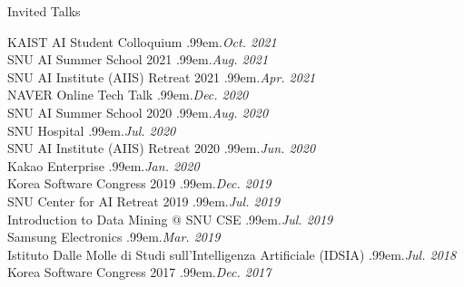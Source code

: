 \documentclass{resume} %
\makeatletter
\newcommand \Dotfill {\leavevmode \cleaders \hb@xt@ .99em{\hss .\hss }\hfill \kern \z@}
\makeatother
\begin{document}
\begin{rSection}{Invited Talks}

KAIST AI Student Colloquium \smallskip \Dotfill \emph{Oct. 2021} \\ 
SNU AI Summer School 2021 \smallskip \Dotfill \emph{Aug. 2021} \\ 
SNU AI Institute (AIIS) Retreat 2021 \smallskip \Dotfill \emph{Apr. 2021} \\ 
NAVER Online Tech Talk \smallskip \Dotfill \emph{Dec. 2020} \\ 
SNU AI Summer School 2020 \smallskip \Dotfill \emph{Aug. 2020} \\ 
SNU Hospital \smallskip \Dotfill \emph{Jul. 2020} \\ 
SNU AI Institute (AIIS) Retreat 2020 \smallskip \Dotfill \emph{Jun. 2020}\\ 
Kakao Enterprise \smallskip \Dotfill \emph{Jan. 2020} \\ 
Korea Software Congress 2019 \smallskip \Dotfill \emph{Dec. 2019} \\ 
SNU Center for AI Retreat 2019 \smallskip \Dotfill \emph{Jul. 2019} \\ 
Introduction to Data Mining @ SNU CSE \smallskip \Dotfill \emph{Jul. 2019} \\ 
Samsung Electronics \smallskip \Dotfill \emph{Mar. 2019} \\ 
Istituto Dalle Molle di Studi sull'Intelligenza Artificiale (IDSIA) \smallskip \Dotfill \emph{Jul. 2018} \\ 
Korea Software Congress 2017 \smallskip \Dotfill \emph{Dec. 2017}

\end{rSection}

\end{document}
